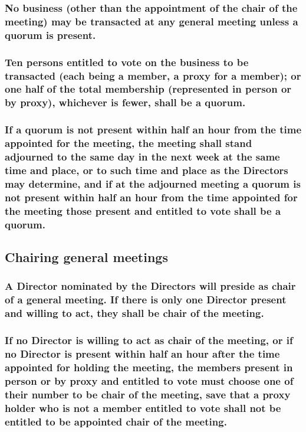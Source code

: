 \documentclass[12pt]{article}
\begin{document}
\subsubsection[Quorum is necessary for business at meetings]{No business (other than the appointment of the chair of the meeting) may be transacted at any general meeting unless a quorum is present.}
\subsubsection[Specifics of quorum constitution]{Ten persons entitled to vote on the business to be transacted (each being a member, a proxy for a member); or one half of the total membership (represented in person or by proxy), whichever is fewer, shall be a quorum.}
\subsubsection[Adjournment as a result of no quorum]{If a quorum is not present within half an hour from the time appointed for the meeting, the meeting shall stand adjourned to the same day in the next week at the same time and place, or to such time and place as the Directors may determine, and if at the adjourned meeting a quorum is not present within half an hour from the time appointed for the meeting those present and entitled to vote shall be a quorum.}

\subsection{Chairing general meetings}
\subsubsection[A Director chairs a general meeting]{A Director nominated by the Directors will preside as chair of a general meeting. If there is only one Director present and willing to act, they shall be chair of the meeting.} \label{subsubsection:nomchair}
\subsubsection[Members may elect a chair in absence of suitable Director]{If no Director is willing to act as chair of the meeting, or if no Director is present within half an hour after the time appointed for holding the meeting, the members present in person or by proxy and entitled to vote must choose one of their number to be chair of the meeting, save that a proxy holder who is not a member entitled to vote shall not be entitled to be appointed chair of the meeting.}
\end{document}
